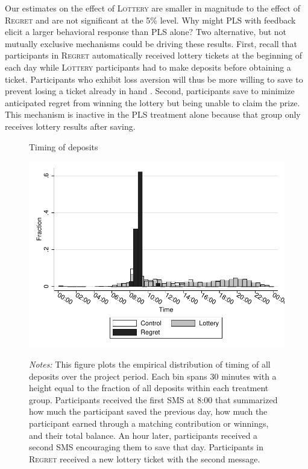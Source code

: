 \documentclass[12pt]{article}
\begin{document}
		Our estimates on the effect of \textsc{Lottery} are smaller in magnitude to the effect of \textsc{Regret} and are not significant at the 5\% level. Why might PLS with feedback elicit a larger behavioral response than PLS alone? Two alternative, but not mutually exclusive mechanisms could be driving these results. First, recall that participants in \textsc{Regret} automatically received lottery tickets at the beginning of each day while \textsc{Lottery} participants had to make deposits before obtaining a ticket. Participants who exhibit loss aversion will thus be more willing to save to prevent losing a ticket already in hand . Second, participants save to minimize anticipated regret from winning the lottery but being unable to claim the prize. This mechanism is inactive in the PLS treatment alone because that group only receives lottery results after saving.

		\begin{figure}[ht]
		\centering
		\caption{Timing of deposits}
		\includegraphics[width=\textwidth]{../../figures/hist-deposits.pdf}
		\label{fig:hist-deposits}
		\caption*{\footnotesize \emph{Notes:} This figure plots the empirical distribution of timing of all deposits over the project period. Each bin spans 30 minutes with a height equal to the fraction of all deposits within each treatment group. Participants received the first SMS at 8:00 that summarized how much the participant saved the previous day, how much the participant earned through a matching contribution or winnings, and their total balance. An hour later, participants received a second SMS encouraging them to save that day. Participants in \textsc{Regret} received a new lottery ticket with the second message.}
		\end{figure}
\end{document}
